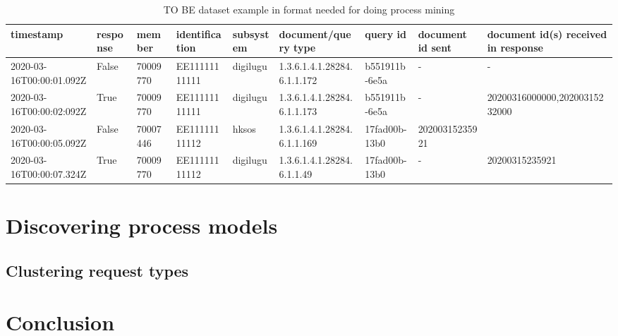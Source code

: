 \documentclass[a4paper, 12pt]{article}
\let\stdsection\section
\renewcommand\section{\newpage\stdsection}
\begin{document}
\begin{landscape}

\begin{table}[]
	\centering
	\small
	\begin{tabular}{lllllllll}
		\hline
		timestamp &
		response &
		member &
		identification &
		subsystem &
		document/query type &
		query id &
		document id sent &
		document id(s) received in response \\ \hline
		2020-03-16T00:00:01.092Z & False & 70009770 & EE11111111111 & digilugu & 1.3.6.1.4.1.28284.6.1.1.172 & b551911b-6e5a & -              & -              \\
		2020-03-16T00:00:02:092Z &
		True &
		70009770 &
		EE11111111111 &
		digilugu &
		1.3.6.1.4.1.28284.6.1.1.173 &
		b551911b-6e5a &
		- &
		20200316000000,20200315232000 \\
		2020-03-16T00:00:05.092Z & False & 70007446 & EE11111111112 & hksos    & 1.3.6.1.4.1.28284.6.1.1.169 & 17fad00b-13b0 & 20200315235921 &                \\
		2020-03-16T00:00:07.324Z & True  & 70009770 & EE11111111112 & digilugu & 1.3.6.1.4.1.28284.6.1.1.49  & 17fad00b-13b0 & -               & 20200315235921 \\ \hline
	\end{tabular}

	\caption{TO BE dataset example in format needed for doing process mining}
	\label{tab:dataset example}
\end{table}
\end{landscape}


\section{Discovering process models}

\subsection{Clustering request types}


\section{Conclusion}
\label{Conclusion} 
\pagebreak


\footnotesize
{}
\end{document}
